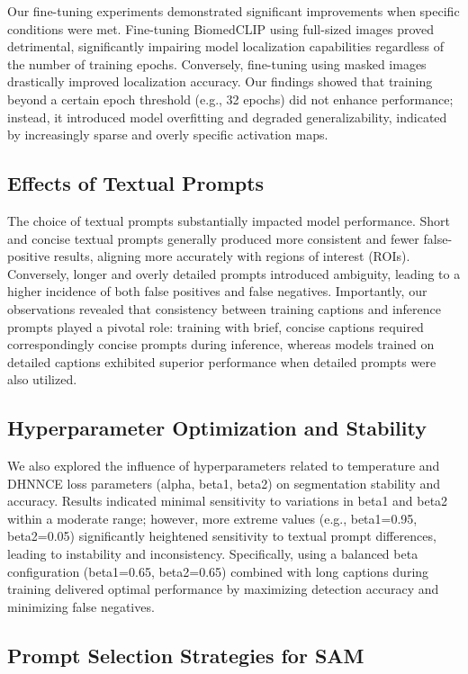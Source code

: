 \documentclass[./dissertation.tex]{subfiles}
\begin{document}
Our fine-tuning experiments demonstrated significant improvements when specific conditions were met. Fine-tuning BiomedCLIP using full-sized images proved detrimental, significantly impairing model localization capabilities regardless of the number of training epochs. Conversely, fine-tuning using masked images drastically improved localization accuracy. Our findings showed that training beyond a certain epoch threshold (e.g., 32 epochs) did not enhance performance; instead, it introduced model overfitting and degraded generalizability, indicated by increasingly sparse and overly specific activation maps.

\subsection{Effects of Textual Prompts}

The choice of textual prompts substantially impacted model performance. Short and concise textual prompts generally produced more consistent and fewer false-positive results, aligning more accurately with regions of interest (ROIs). Conversely, longer and overly detailed prompts introduced ambiguity, leading to a higher incidence of both false positives and false negatives. Importantly, our observations revealed that consistency between training captions and inference prompts played a pivotal role: training with brief, concise captions required correspondingly concise prompts during inference, whereas models trained on detailed captions exhibited superior performance when detailed prompts were also utilized.

\subsection{Hyperparameter Optimization and Stability}

We also explored the influence of hyperparameters related to temperature and DHNNCE loss parameters (alpha, beta1, beta2) on segmentation stability and accuracy. Results indicated minimal sensitivity to variations in beta1 and beta2 within a moderate range; however, more extreme values (e.g., beta1=0.95, beta2=0.05) significantly heightened sensitivity to textual prompt differences, leading to instability and inconsistency. Specifically, using a balanced beta configuration (beta1=0.65, beta2=0.65) combined with long captions during training delivered optimal performance by maximizing detection accuracy and minimizing false negatives.

\subsection{Prompt Selection Strategies for SAM}
\end{document}
